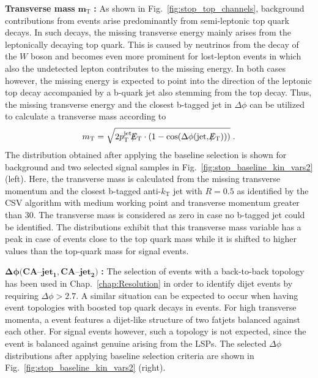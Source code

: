 \begin{description}
 \item \textbf{Transverse mass} $\mathbf{m_\mathrm{T}}$ \textbf{:} As shown in Fig.~\ref{fig:stop_top_channels}, background contributions from \ttbar events arise predominantly from semi-leptonic top quark decays. In such decays, the missing transverse energy mainly arises from the leptonically decaying top quark. This is caused by neutrinos from the decay of the $W$ boson and becomes even more prominent for lost-lepton events in which also the undetected lepton contributes to the missing energy. In both cases however, the missing energy is expected to point into the direction of the leptonic top decay accompanied by a b-quark jet also stemming from the top decay. Thus, the missing transverse energy and the closest b-tagged jet in $\Delta \phi$ can be utilized to calculate a transverse mass according to
\begin{equation}
m_\mathrm{T} = \sqrt{2 p_{\text{T}}^\mathrm{jet}\slash\mkern-12mu{E}_{\text{T}} \cdot (1-\mathrm{cos}(\Delta \phi(\mathrm{jet}, \slash\mkern-12mu{E}_{\text{T}})))} \; .
\end{equation}   
The distribution obtained after applying the baseline selection is shown for background and two selected signal samples in Fig.~\ref{fig:stop_baseline_kin_vars2} (left). Here, the transverse mass is calculated from the missing transverse momentum and the closest b-tagged anti-$k_\mathrm{T}$ jet with $R = 0.5$ as identified by the CSV algorithm with medium working point and transverse momentum greater than 30\gev. The transverse mass is considered as zero in case no b-tagged jet could be identified. The distributions exhibit that this transverse mass variable has a peak in case of \ttbar events close to the top quark mass while it is shifted to higher values than the top-quark mass for signal events. 
 \item $\mathbf{\Delta \phi(CA}$--$\mathbf{jet_1, CA}$--$\mathbf{jet_2)}$ \textbf{:} The selection of events with a back-to-back topology has been used in Chap.~\ref{chap:Resolution} in order to identify dijet events by requiring $\Delta \phi > 2.7$. A similar situation can be expected to occur when having event topologies with boosted top quark decays in \ttbar events. For high transverse momenta, a \ttbar event features a dijet-like structure of two fatjets balanced against each other. For signal events however, such a topology is not expected, since the event is balanced against genuine \met arising from the LSPs. The selected $\Delta \phi$ distributions after applying baseline selection criteria are shown in Fig.~\ref{fig:stop_baseline_kin_vars2} (right).  
\end{description}
